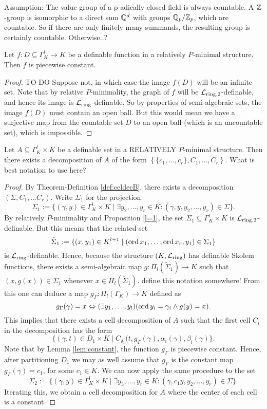{\color{red} Assumption: The value group of a p-adically closed field is always countable. A ${{\mathbb Z}}$-group is isomorphic to a direct sum ${{\mathbb Q}}^d$ with groups ${{\mathbb Q}}_p/{{\mathbb Z}}_p$, which are countable. So if there are only finitely many summands, the resulting group is certainly countable. Otherwise..?} 
\begin{lem}\label{lem:constant}
Let $f: D\subseteq \Gamma_K^l \to K$ be a definable function in a relatively $P$-minimal structure. Then $f$ is piecewise constant.
\end{lem}
\begin{proof}
{\color{red} TO DO}
Suppose not, in which case the image $f(D)$ will be an infinite set. Note that by relative $P$-minimality, the graph of $f$ will be $\mathcal{L}_{\text{ring,2}}$-definable, and hence its image is $\mathcal{L}_{\text{ring}}$-definable. So by properties of semi-algebraic sets, the image $f(D)$ must contain an open ball. But this would mean we have a surjective map from the {\color{red} countable} set $D$ to an open ball (which is an uncountable set), which is impossible.
\end{proof}
\begin{lem}
Let $A \subseteq \Gamma_K^l \times K$ be a definable set in a RELATIVELY $P$-minimal structure. Then there exists 
a decomposition of $A$ of the form 
$\left\{\{c_1, \ldots, c_r\}, C_1, \ldots, C_r\right\}.${\color{red} What is best notation to use here?}
\end{lem}
\begin{proof}
By Theorem-Definition \ref{def:celdecB}, there exists a decomposition $(\Sigma, C_1, \ldots C_r)$. Write $\Sigma_1$ for the projection
\[\Sigma_1:= \{(\gamma, y) \in \Gamma_K^l \times K \mid \exists y_2, \ldots, y_r \in K: (\gamma, y, y_2, \ldots, y_r) \in \Sigma\}.\]
By relatively $P$-minimality and Proposition \ref{l=1}, the set $\Sigma_1 \subseteq \Gamma_K^l \times K$ is $\mathcal{L}_{\text{ring,2}}$-definable. But this means that the related set
\[\tilde{\Sigma}_1:= \{(x,y_1) \in K^{l+1} \mid (\operatorname{ord} x_1, \ldots, \operatorname{ord} x_r, y_1) \in \Sigma_1\}\] is $\mathcal{L}_{\text{ring}}$-definable.
Hence, because the structure $(K,\mathcal{L}_{\text{ring}})$ has definable Skolem functions, there exists a semi-algebraic map $g:\Pi_l(\tilde{\Sigma}_1) \to K$ such that $(x, g(x)) \in \Sigma_1$ whenever $x \in \Pi_l(\tilde{\Sigma}_1)$. {\color{red} define this notation somewhere!} From this one can deduce a map
$g_\Gamma: \Pi_l(\Gamma_K)\to K$ defined as
\[g_{\Gamma}(\gamma) = x \Leftrightarrow (\exists y_1, \ldots, y_l)(\operatorname{ord} y_i = \gamma_i \wedge g(y) =x).\]
This implies that there exists a cell decomposition of $A$ such that the first cell $C_i$ in the decomposition has the form
\[\{(\gamma, t) \in D_1 \times K \mid C_{\delta_1}(t, g_{\Gamma}(\gamma), \alpha_i(\gamma), \beta_i(\gamma)\}.\]
Note that by Lemma \ref{lem:constant}, the function $g_{\Gamma}$ is piecewise constant. Hence, after partitioning $D_1$ we may as well assume that $g_{\Gamma}$ is the constant map $g_{\Gamma}(\gamma) = c_1$, for some $c_1 \in K$.
We can now apply the same procedure to the set 
\[\Sigma_2:= \{(\gamma, y) \in \Gamma_K^l \times K \mid \exists y_3, \ldots, y_r \in K: (\gamma, c_1 y, y_2, \ldots, y_r) \in \Sigma\}.\]
Iterating this, we obtain a cell decomposition for $A$ where the center of each cell is a constant. 
\end{proof}
